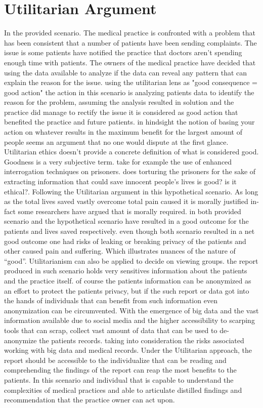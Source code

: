 \documentclass{article}
\begin{document}
\section{Utilitarian Argument}
In the provided scenario. The medical practice is confronted with a problem that has been consistent that a number of patients have been sending complaints. The issue is some patients have notified the practice that doctors aren't spending enough time with patients. The owners of the medical practice have decided that using the data available to analyze if the data can reveal any pattern that can explain the reason for the issue. using the utilitarian lens as "good consequence = good action" the action in this scenario is analyzing patients data to identify the reason for the problem, assuming the analysis resulted in solution and the practice did manage to rectify the issue it is considered as good action that benefited the practice and future patients. in hindsight the notion of basing your action on whatever results in the maximum benefit for the largest amount of people seems an argument that no one would dispute at the first glance. Utilitarian ethics doesn't provide a concrete definition of what is considered good. Goodness is a very subjective term. take for example the use of enhanced interrogation techniques on prisoners. does torturing the prisoners for the sake of extracting information that could save innocent people's lives is good? is it ethical?. Following the Utilitarian argument in this hypothetical scenario. As long as the  total lives saved vastly overcome total pain caused it is morally justified in-fact some researchers have argued that is morally required. in both provided scenario and the hypothetical scenario have resulted in a good outcome for the patients and lives saved respectively. even though both scenario resulted in a net good outcome one had risks of leaking or breaking privacy of the patients and other caused pain and suffering. Which illustrates nuances of the nature of “good”.  Utilitarianism can also be applied to decide on viewing groups. the report produced in such scenario holds very sensitives information about the patients and the practice itself. of course the patients information can be anonymized as an effort to protect the patients privacy, but if the such report or data got into the hands of individuals that can benefit from such information even anonymization can be circumvented. With the emergence of big data and the vast information available due to social media and the higher accessibility to scarping tools that can scrap, collect vast amount of data that can be used to de-anonymize the patients records. taking into consideration the risks associated working with big data and medical records. Under the Utilitarian approach, the report should be accessible to the individualize that can be reading and comprehending the findings of the report can reap the most benefits to the patients. In this scenario and individual that is capable to understand the complexities of medical practices and able to articulate distilled findings and recommendation that the practice owner can act upon. 
\end{document}
